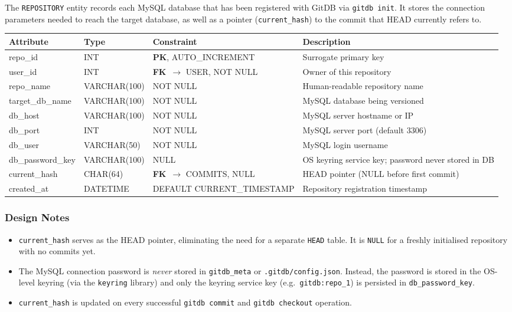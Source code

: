 \documentclass[12pt, a4paper]{article}
\newcommand{\pk}{\textbf{\textcolor{sectioncolor}{PK}}}
\newcommand{\fk}{\textbf{\textcolor{red!70!black}{FK}}}
\begin{document}
The \texttt{REPOSITORY} entity records each MySQL database that has been
registered with GitDB via \texttt{gitdb init}. It stores the connection
parameters needed to reach the target database, as well as a pointer
(\texttt{current\_hash}) to the commit that HEAD currently refers to.

\begin{center}
\begin{tabular}{>{\ttfamily}l >{\ttfamily}l l l}
\toprule
\textbf{Attribute} & \textbf{Type} & \textbf{Constraint} & \textbf{Description} \\
\midrule
repo\_id        & INT          & \pk, AUTO\_INCREMENT      & Surrogate primary key \\
user\_id        & INT          & \fk\ $\to$ USER, NOT NULL & Owner of this repository \\
repo\_name      & VARCHAR(100) & NOT NULL                  & Human-readable repository name \\
target\_db\_name & VARCHAR(100)& NOT NULL                  & MySQL database being versioned \\
db\_host        & VARCHAR(100) & NOT NULL                  & MySQL server hostname or IP \\
db\_port        & INT          & NOT NULL                  & MySQL server port (default 3306) \\
db\_user        & VARCHAR(50)  & NOT NULL                  & MySQL login username \\
db\_password\_key & VARCHAR(100) & NULL                    & OS keyring service key; password never stored in DB \\
current\_hash   & CHAR(64)     & \fk\ $\to$ COMMITS, NULL  & HEAD pointer (NULL before first commit) \\
created\_at     & DATETIME     & DEFAULT CURRENT\_TIMESTAMP & Repository registration timestamp \\
\bottomrule
\end{tabular}
\end{center}

\subsubsection*{Design Notes}
\begin{itemize}[leftmargin=1.5em]
    \item \texttt{current\_hash} serves as the HEAD pointer, eliminating the
    need for a separate \texttt{HEAD} table. It is \texttt{NULL} for a freshly
    initialised repository with no commits yet.
    \item The MySQL connection password is \emph{never} stored in \texttt{gitdb\_meta}
    or \texttt{.gitdb/config.json}. Instead, the password is stored in the OS-level
    keyring (via the \texttt{keyring} library) and only the keyring service key
    (e.g.\ \texttt{gitdb:repo\_1}) is persisted in \texttt{db\_password\_key}.
    \item \texttt{current\_hash} is updated on every successful
    \texttt{gitdb commit} and \texttt{gitdb checkout} operation.
\end{itemize}
\end{document}
